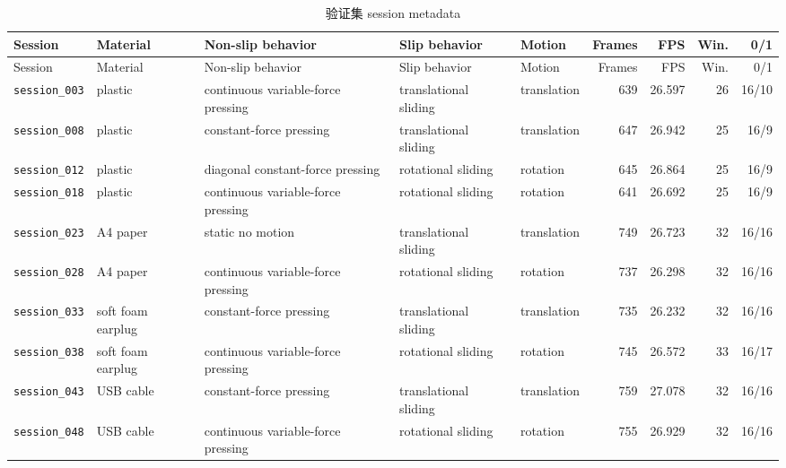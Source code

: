 \documentclass[UTF8,a4paper,11pt]{ctexart}
\begin{document}
\begin{longtable}{lp{1.55cm}p{2.7cm}p{2.65cm}lrrrr}
\caption{验证集 session metadata}\\
\toprule
Session & Material & Non-slip behavior & Slip behavior & Motion & Frames & FPS & Win. & 0/1 \\
\midrule
\endfirsthead
\toprule
Session & Material & Non-slip behavior & Slip behavior & Motion & Frames & FPS & Win. & 0/1 \\
\midrule
\endhead
\texttt{session\_003} & plastic & continuous variable-force pressing & translational sliding & translation & 639 & 26.597 & 26 & 16/10 \\
\texttt{session\_008} & plastic & constant-force pressing & translational sliding & translation & 647 & 26.942 & 25 & 16/9 \\
\texttt{session\_012} & plastic & diagonal constant-force pressing & rotational sliding & rotation & 645 & 26.864 & 25 & 16/9 \\
\texttt{session\_018} & plastic & continuous variable-force pressing & rotational sliding & rotation & 641 & 26.692 & 25 & 16/9 \\
\texttt{session\_023} & A4 paper & static no motion & translational sliding & translation & 749 & 26.723 & 32 & 16/16 \\
\texttt{session\_028} & A4 paper & continuous variable-force pressing & rotational sliding & rotation & 737 & 26.298 & 32 & 16/16 \\
\texttt{session\_033} & soft foam earplug & constant-force pressing & translational sliding & translation & 735 & 26.232 & 32 & 16/16 \\
\texttt{session\_038} & soft foam earplug & continuous variable-force pressing & rotational sliding & rotation & 745 & 26.572 & 33 & 16/17 \\
\texttt{session\_043} & USB cable & constant-force pressing & translational sliding & translation & 759 & 27.078 & 32 & 16/16 \\
\texttt{session\_048} & USB cable & continuous variable-force pressing & rotational sliding & rotation & 755 & 26.929 & 32 & 16/16 \\
\bottomrule
\end{longtable}
\end{document}
